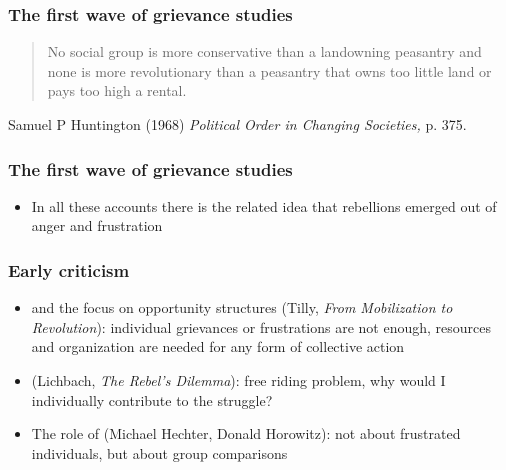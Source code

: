 \documentclass[aspectratio=43]{beamer}
\begin{document}
\begin{frame}
\frametitle{The first wave of grievance studies}
\centering

\begin{quote}
No social group is more conservative than a landowning peasantry and none is more revolutionary than a peasantry that owns too little land or pays too high a rental.
\end{quote}

\vspace{10pt}

{\footnotesize Samuel P Huntington (1968) \textit{Political Order in Changing Societies,} p. 375.}

\end{frame}

\begin{frame}
\frametitle{The first wave of grievance studies}
\centering

\begin{itemize}
  \item In all these accounts there is the related idea that rebellions emerged out of anger and frustration
\end{itemize}

\end{frame}

\begin{frame}
\frametitle{Early criticism}
\centering

\begin{itemize}
  \item<2->  and the focus on opportunity structures (Tilly, \textit{From Mobilization to Revolution}): individual grievances or frustrations are not enough, resources and organization are needed for any form of collective action
  \item<3->  (Lichbach, \textit{The Rebel's Dilemma}): free riding problem, why would I individually contribute to the struggle?
  \item<4-> The role of  (Michael Hechter, Donald Horowitz): not about frustrated individuals, but about group comparisons
\end{itemize}

\end{frame}
\end{document}
